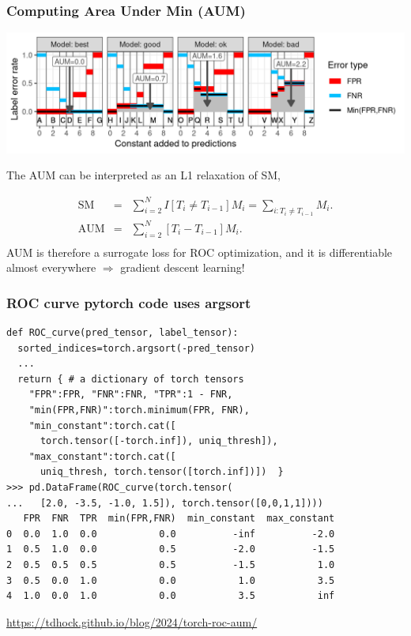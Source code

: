 \documentclass[t]{beamer}
\begin{document}
\begin{frame}
  \frametitle{Computing Area Under Min (AUM)}
  \includegraphics[width=\textwidth]{figure-more-than-one-new-binary-aum-rate}

The AUM can be interpreted as an L1 relaxation of SM,

\begin{eqnarray*}
    \text{SM} &=&
    \sum_{i=2}^{N}
    I[ T_{i} \neq T_{i-1} ]
    M_i =
    \sum_{i:T_{i} \neq T_{i-1} }
                  M_i.
                                    \\
    \text{AUM} &=&
    \sum_{i=2}^{N}
    [ T_{i} - T_{i-1} ]
                   M_i.\\
\end{eqnarray*}
AUM is therefore a surrogate loss for ROC optimization, and it is differentiable almost everywhere $\Rightarrow$ gradient descent learning!
\end{frame}

\begin{frame}[fragile]
  \frametitle{ROC curve pytorch code uses argsort}
\small
  \begin{verbatim}
def ROC_curve(pred_tensor, label_tensor):
  sorted_indices=torch.argsort(-pred_tensor)
  ...
  return { # a dictionary of torch tensors
    "FPR":FPR, "FNR":FNR, "TPR":1 - FNR,
    "min(FPR,FNR)":torch.minimum(FPR, FNR),
    "min_constant":torch.cat([
      torch.tensor([-torch.inf]), uniq_thresh]),
    "max_constant":torch.cat([
      uniq_thresh, torch.tensor([torch.inf])])  }
>>> pd.DataFrame(ROC_curve(torch.tensor(
...   [2.0, -3.5, -1.0, 1.5]), torch.tensor([0,0,1,1])))
   FPR  FNR  TPR  min(FPR,FNR)  min_constant  max_constant
0  0.0  1.0  0.0           0.0          -inf          -2.0
1  0.5  1.0  0.0           0.5          -2.0          -1.5
2  0.5  0.5  0.5           0.5          -1.5           1.0
3  0.5  0.0  1.0           0.0           1.0           3.5
4  1.0  0.0  1.0           0.0           3.5           inf
\end{verbatim}

    \url{https://tdhock.github.io/blog/2024/torch-roc-aum/}

\end{frame}
\end{document}
